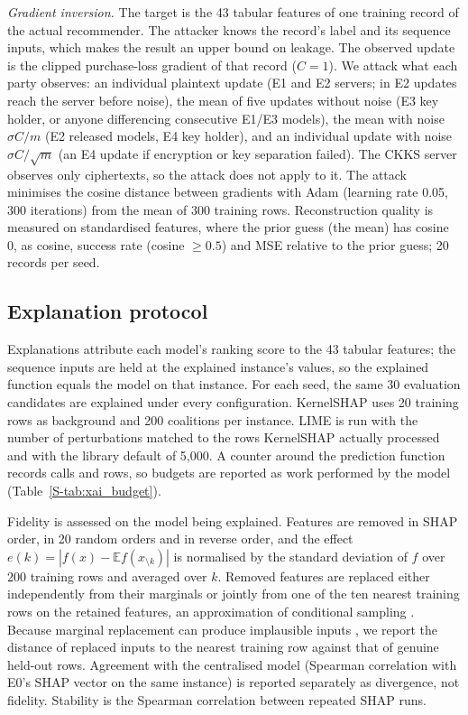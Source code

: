 \documentclass[11pt,a4paper]{article}
\begin{document}
\textit{Gradient inversion.} The target is the 43 tabular features of one training record of the actual recommender. The attacker knows the record's label and its sequence inputs, which makes the result an upper bound on leakage. The observed update is the clipped purchase-loss gradient of that record ($C=1$). We attack what each party observes: an individual plaintext update (E1 and E2 servers; in E2 updates reach the server before noise), the mean of five updates without noise (E3 key holder, or anyone differencing consecutive E1/E3 models), the mean with noise $\sigma C/m$ (E2 released models, E4 key holder), and an individual update with noise $\sigma C/\sqrt m$ (an E4 update if encryption or key separation failed). The CKKS server observes only ciphertexts, so the attack does not apply to it. The attack minimises the cosine distance between gradients \cite{geiping2020inverting} with Adam (learning rate 0.05, 300 iterations) from the mean of 300 training rows. Reconstruction quality is measured on standardised features, where the prior guess (the mean) has cosine 0, as cosine, success rate (cosine $\geq 0.5$) and MSE relative to the prior guess; 20 records per seed.

\subsection{Explanation protocol}

Explanations attribute each model's ranking score to the 43 tabular features; the sequence inputs are held at the explained instance's values, so the explained function equals the model on that instance. For each seed, the same 30 evaluation candidates are explained under every configuration. KernelSHAP uses 20 training rows as background and 200 coalitions per instance. LIME is run with the number of perturbations matched to the rows KernelSHAP actually processed and with the library default of 5,000. A counter around the prediction function records calls and rows, so budgets are reported as work performed by the model (Table~\ref{S-tab:xai_budget}).

Fidelity is assessed on the model being explained. Features are removed in SHAP order, in 20 random orders and in reverse order, and the effect $e(k)=|f(x)-\mathbb{E}f(x_{\setminus k})|$ is normalised by the standard deviation of $f$ over 200 training rows and averaged over $k$. Removed features are replaced either independently from their marginals or jointly from one of the ten nearest training rows on the retained features, an approximation of conditional sampling \cite{aas2021explaining}. Because marginal replacement can produce implausible inputs \cite{hooker2019benchmark}, we report the distance of replaced inputs to the nearest training row against that of genuine held-out rows. Agreement with the centralised model (Spearman correlation with E0's SHAP vector on the same instance) is reported separately as divergence, not fidelity. Stability is the Spearman correlation between repeated SHAP runs.
\end{document}
